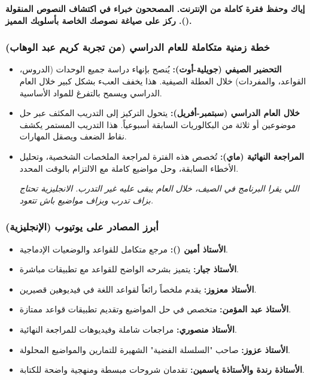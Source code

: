 \documentclass[12pt,a4paper]{book}
\newcommand{\quoteAr}[1]{%
	\begin{myquote}
		\itshape #1
	\end{myquote}
}
\newcommand{\importantAr}[1]{%
	\begin{important}
		\bfseries #1
	\end{important}
}
\begin{document}
	\importantAr{إياك وحفظ فقرة كاملة من الإنترنت. المصححون خبراء في اكتشاف النصوص المنقولة (\LR{copie-colle}). ركز على صياغة نصوصك الخاصة بأسلوبك المميز.}
	
	\subsubsection{خطة زمنية متكاملة للعام الدراسي (من تجربة كريم عبد الوهاب)}
		\begin{itemize}
		\item \textbf{التحضير الصيفي (جويلية-أوت):} يُنصح بإنهاء دراسة جميع الوحدات  \newline (الدروس، القواعد، والمفردات) خلال العطلة الصيفية. هذا يخفف العبء بشكل كبير خلال العام الدراسي ويسمح بالتفرغ للمواد الأساسية.
	
	\item \textbf{خلال العام الدراسي (سبتمبر-أفريل):} يتحول التركيز إلى التدريب المكثف عبر حل موضوعين أو ثلاثة من البكالوريات السابقة أسبوعياً. هذا التدريب المستمر يكشف نقاط الضعف ويصقل المهارات.
	
	\item \textbf{المراجعة النهائية (ماي):} تُخصص هذه الفترة لمراجعة الملخصات الشخصية، وتحليل الأخطاء السابقة، وحل مواضيع كاملة مع الالتزام بالوقت المحدد.
	
	\quoteAr{اللي يقرا البرنامج في الصيف، خلال العام يبقى عليه غير التدرب. الانجليزية تحتاج بزاف تدرب وبزاف مواضيع باش تتعود.}
		\end{itemize}
	\subsubsection{أبرز المصادر على يوتيوب (الإنجليزية)}
	
	\begin{itemize}
		\item \textbf{الأستاذ أمين ():} مرجع متكامل للقواعد والوضعيات الإدماجية.
		\item \textbf{الأستاذ جيار:} يتميز بشرحه الواضح للقواعد مع تطبيقات مباشرة.
		\item \textbf{الأستاذ معزوز:} يقدم ملخصاً رائعاً لقواعد اللغة في فيديوهين قصيرين.
		\item \textbf{الأستاذ عبد المؤمن:} متخصص في حل المواضيع وتقديم تطبيقات قواعد ممتازة.
		\item \textbf{الأستاذ منصوري:} مراجعات شاملة وفيديوهات للمراجعة النهائية.
		\item \textbf{الأستاذ عزوز:} صاحب "السلسلة الفضية" الشهيرة للتمارين والمواضيع المحلولة.
		\item \textbf{الأستاذة رندة والأستاذة ياسمين:} تقدمان شروحات مبسطة \newline ومنهجية واضحة للكتابة.
	\end{itemize}
	
\end{document}
